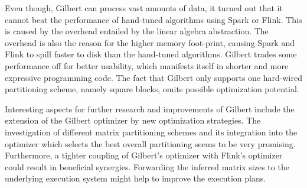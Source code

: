 Even though, Gilbert can process vast amounts of data, it turned out that it cannot beat the performance of hand-tuned algorithms using Spark or Flink.
This is caused by the overhead entailed by the linear algebra abstraction.
The overhead is also the reason for the higher memory foot-print, causing Spark and Flink to spill faster to disk than the hand-tuned algorithms.
Gilbert trades some performance off for better usability, which manifests itself in shorter and more expressive programming code.
The fact that Gilbert only supports one hard-wired partitioning scheme, namely square blocks, omits possible optimization potential.

Interesting aspects for further research and improvements of Gilbert include the extension of the Gilbert optimizer by new optimization strategies.
The investigation of different matrix partitioning schemes and its integration into the optimizer which selects the best overall partitioning seems to be very promising.
Furthermore, a tighter coupling of Gilbert's optimizer with Flink's optimizer could result in beneficial synergies.
Forwarding the inferred matrix sizes to the underlying execution system might help to improve the execution plans.